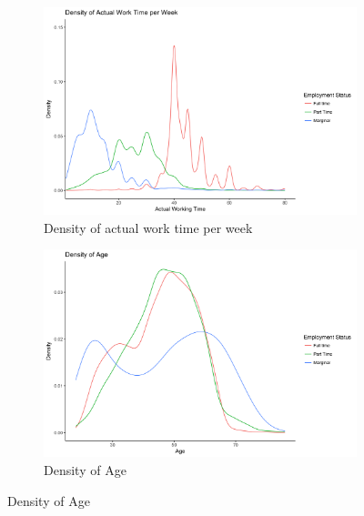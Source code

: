 \documentclass[a4paper]{article}
\begin{document}
\begin{figure}
\caption{Density Plots}
\begin{subfigure}[h]{0.5\linewidth}
\includegraphics[width=\textwidth]{q2/plot_ouput_density_actual_work.png}
\caption{Density of actual work time per week}
\end{subfigure}
\hfill
\begin{subfigure}[h]{0.5\linewidth}
\includegraphics[width=\textwidth]{q2/plot_output_density_age.png}
\caption{Density of Age}
\end{subfigure}
\label{q6m}


\end{figure}
\end{document}
